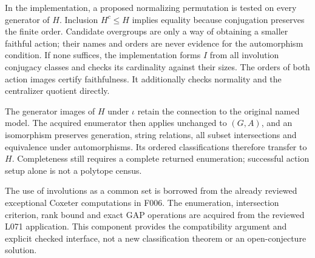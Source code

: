\documentclass[11pt,a4paper]{article}
\begin{document}
In the implementation, a proposed normalizing permutation is tested
on every generator of $H$. Inclusion $H^c\leq H$ implies equality
because conjugation preserves the finite order. Candidate overgroups
are only a way of obtaining a smaller faithful action; their names and
orders are never evidence for the automorphism condition. If none
suffices, the implementation forms $I$ from all involution conjugacy
classes and checks its cardinality against their sizes. The orders of
both action images certify faithfulness. It additionally checks
normality and the centralizer quotient directly.

The generator images of $H$ under $\iota$ retain the connection to the
original named model. The acquired enumerator then applies unchanged
to $(G,A)$, and an isomorphism preserves generation, string relations,
all subset intersections and equivalence under automorphisms. Its
ordered classifications therefore transfer to $H$. Completeness still
requires a complete returned enumeration; successful action setup alone
is not a polytope census.

The use of involutions as a common set is borrowed from the already
reviewed exceptional Coxeter computations in F006. The enumeration,
intersection criterion, rank bound and exact GAP operations are
acquired from the reviewed L071 application. This component provides
the compatibility argument and explicit checked interface, not a new
classification theorem or an open-conjecture solution.
\end{document}

